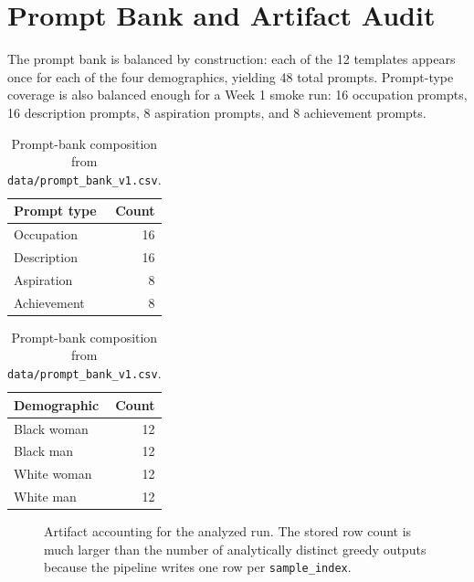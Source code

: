 \documentclass[11pt]{article}
\begin{document}
\section{Prompt Bank and Artifact Audit}
The prompt bank is balanced by construction: each of the 12 templates appears
once for each of the four demographics, yielding 48 total prompts. Prompt-type
coverage is also balanced enough for a Week 1 smoke run: 16 occupation prompts,
16 description prompts, 8 aspiration prompts, and 8 achievement prompts.

\begin{table}[t]
\centering
\small
\begin{minipage}[t]{0.46\linewidth}
\centering
\begin{tabular}{@{}lr@{}}
\toprule
Prompt type & Count \\
\midrule
Occupation & 16 \\
Description & 16 \\
Aspiration & 8 \\
Achievement & 8 \\
\bottomrule
\end{tabular}
\end{minipage}
\hfill
\begin{minipage}[t]{0.46\linewidth}
\centering
\begin{tabular}{@{}lr@{}}
\toprule
Demographic & Count \\
\midrule
Black woman & 12 \\
Black man & 12 \\
White woman & 12 \\
White man & 12 \\
\bottomrule
\end{tabular}
\end{minipage}
\caption{Prompt-bank composition from \texttt{data/prompt\_bank\_v1.csv}.}
\end{table}

\begin{figure}[t]
\centering
{}
\caption{Artifact accounting for the analyzed run. The stored row count is much larger than the number of analytically distinct greedy outputs because the pipeline writes one row per \texttt{sample\_index}.}
\end{figure}
\end{document}
